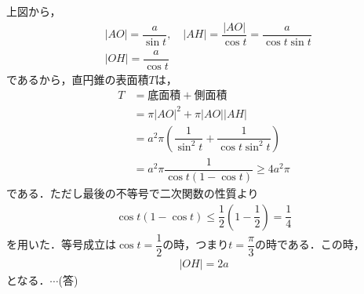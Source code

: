 \documentclass[../../main.tex]{subfiles}
\begin{document}
上図から，
\begin{align}
  &|AO|=\dfrac{a}{\sin t}, \quad |AH|=\dfrac{|AO|}{\cos t} = \dfrac{a}{\cos t\sin t} \\
  &|OH|=\dfrac{a}{\cos t}
\end{align}
であるから，直円錐の表面積$T$は，
\begin{align}
  T&=\text{底面積}+\text{側面積} \\
  &=\pi|AO|^2+\pi|AO||AH| \\
  &=a^2\pi\left(\dfrac{1}{\sin^2t}+\dfrac{1}{\cos t\sin^2t}\right) \\
  &=a^2\pi\dfrac{1}{\cos t(1-\cos t)}\ge 4a^2\pi
\end{align}
である．ただし最後の不等号で二次関数の性質より
\begin{align}
  \cos t(1-\cos t) \le \dfrac{1}{2}\left(1-\dfrac{1}{2}\right) = \dfrac{1}{4}
\end{align}
を用いた．等号成立は$\cos t=\dfrac{1}{2}$の時，つまり$t=\dfrac{\pi}{3}$の時である．この時，
\begin{align}
  |OH|=2a
\end{align}
となる．$\cdots$(答)
\newpage
\end{document}
